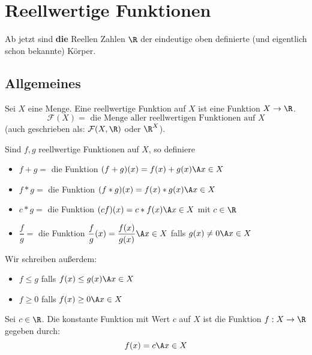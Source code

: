 \documentclass[main.tex]{subfiles}
\begin{document}
\chapter{Reellwertige Funktionen}

Ab jetzt sind \textbf{die} Reellen Zahlen $\R$ der eindeutige oben definierte (und eigentlich schon bekannte) Körper.


\section{Allgemeines}

\begin{Definition}
  Sei $X$ eine Menge. Eine reellwertige Funktion auf $X$ ist eine Funktion $X \to \R$.
  $$\mathcal{F}(X) = \text{ die Menge aller reellwertigen Funktionen auf } X$$
  (auch geschrieben als: $\mathcal{F}(X,\R)$ oder $\R^X$).\\
\end{Definition}

\begin{Definition}
  Sind $f,g$ reellwertige Funktionen auf $X$, so definiere
  \begin{itemize}
    \item $f+g = $ die Funktion $(f+g)(x) = f(x)+g(x) \A x \in X$
    \item $f*g = $ die Funktion $(f*g)(x) = f(x)*g(x) \A x \in X$
    \item $c*g = $ die Funktion $(cf)(x) = c*f(x) \A x \in X$ mit $c\in\R$
    \item $\dfrac{f}{g} = $ die Funktion $\dfrac{f}{g}(x) = \dfrac{f(x)}{g(x)} \A x \in X$ falls $g(x) \neq 0 \A x \in X$
  \end{itemize}
\end{Definition}

\begin{Definition}
  Wir schreiben außerdem:
  \begin{itemize}
    \item $f \leq g$ falls $f(x) \leq g(x) \A x \in X$
    \item $f \geq 0$ falls $f(x) \geq 0 \A x \in X$
  \end{itemize}
\end{Definition}

\begin{Definition}
  Sei $c \in \R$. Die konstante Funktion mit Wert $c$ auf $X$ ist die Funktion $f: X \to \R$ gegeben durch:
  $$f(x) = c \A x\in X$$
\end{Definition}
\end{document}
